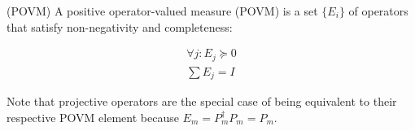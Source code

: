 \documentclass[main.tex]{subfiles}
\begin{document}
\begin{definition}
(POVM) A positive operator-valued measure (POVM) is a set $\{E_i\}$ of operators that satisfy non-negativity and completeness:

\begin{align*}
\forall	j: E_j \succcurlyeq 0 \\
\sum E_j = I
\end{align*}
\end{definition}

Note that projective operators are the special case of being equivalent to their respective POVM element because $E_m = P_m^\dag P_m = P_m$.

%
%
%
%
%
\end{document}
